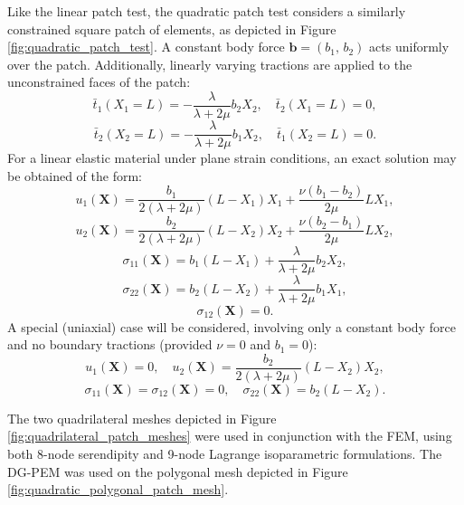 Like the linear patch test, the quadratic patch test considers a similarly constrained square patch of elements, as depicted in Figure \ref{fig:quadratic_patch_test}. A constant body force $\bm{b} = (b_1, \, b_2)$ acts uniformly over the patch. Additionally, linearly varying tractions are applied to the unconstrained faces of the patch:
\begin{equation}
	\bar{t}_1 (X_1 = L) = - \frac{\lambda}{\lambda + 2 \mu} b_2 X_2, \quad \bar{t}_2 (X_1 = L) = 0,
\end{equation}
\begin{equation}
	\bar{t}_2 (X_2 = L) = - \frac{\lambda}{\lambda + 2 \mu} b_1 X_2, \quad \bar{t}_1 (X_2 = L) = 0.
\end{equation}
For a linear elastic material under plane strain conditions, an exact solution may be obtained of the form:
\begin{equation}
	u_1 (\bm{X}) = \frac{b_1}{2 (\lambda + 2 \mu)} (L - X_1) X_1 + \frac{\nu (b_1 - b_2)}{2 \mu} L X_1,
\end{equation}
\begin{equation}
	u_2 (\bm{X}) = \frac{b_2}{2 (\lambda + 2 \mu)} (L - X_2) X_2 + \frac{\nu (b_2 - b_1)}{2 \mu} L X_2,
\end{equation}
\begin{equation}
	\sigma_{11} (\bm{X}) = b_1 (L - X_1) + \frac{\lambda}{\lambda + 2 \mu} b_2 X_2,
\end{equation}
\begin{equation}
	\sigma_{22} (\bm{X}) = b_2 (L -  X_2) + \frac{\lambda}{\lambda + 2 \mu} b_1 X_1,
\end{equation}
\begin{equation}
	\sigma_{12} (\bm{X}) = 0.
\end{equation}
A special (uniaxial) case will be considered, involving only a constant body force and no boundary tractions (provided $\nu = 0$ and $b_1 = 0$):
\begin{equation}
	u_1 (\bm{X}) = 0, \quad u_2 (\bm{X}) = \frac{b_2}{2 (\lambda + 2 \mu)} (L - X_2) X_2,
\end{equation}
\begin{equation}
	\sigma_{11} (\bm{X}) = \sigma_{12} (\bm{X}) = 0, \quad \sigma_{22} (\bm{X}) = b_2 (L -  X_2).
\end{equation}

The two quadrilateral meshes depicted in Figure \ref{fig:quadrilateral_patch_meshes} were used in conjunction with the FEM, using both 8-node serendipity and 9-node Lagrange isoparametric formulations. The DG-PEM was used on the polygonal mesh depicted in Figure \ref{fig:quadratic_polygonal_patch_mesh}.

